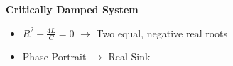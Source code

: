 \documentclass[preview]{standalone}
\begin{document}
\begin{center}
\textbf{Critically Damped System}
                    \begin{itemize}
                        \item $R^2 - \frac{4L}{C} = 0$ $\rightarrow$ Two equal, negative real roots
                        \item Phase Portrait $\rightarrow$ Real Sink
                    \end{itemize}
\end{center}
\end{document}
